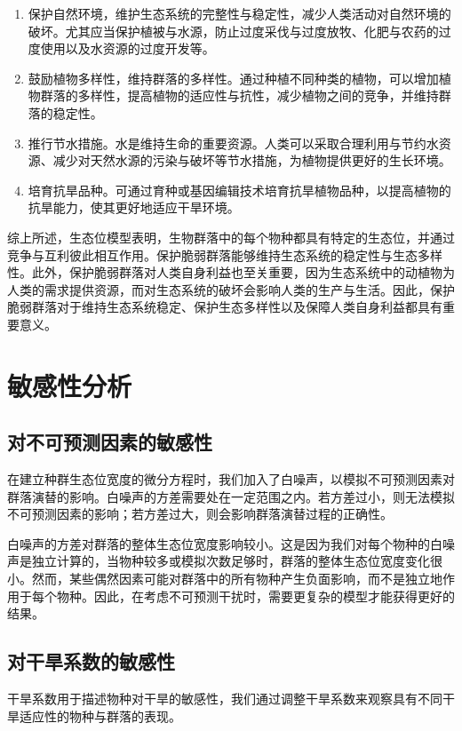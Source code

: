 \documentclass[11pt,a4paper]{ctexart}
\begin{document}
\begin{enumerate}
\item 保护自然环境，维护生态系统的完整性与稳定性，减少人类活动对自然环境的破坏。尤其应当保护植被与水源，防止过度采伐与过度放牧、化肥与农药的过度使用以及水资源的过度开发等。
\item 鼓励植物多样性，维持群落的多样性。通过种植不同种类的植物，可以增加植物群落的多样性，提高植物的适应性与抗性，减少植物之间的竞争，并维持群落的稳定性。
\item 推行节水措施。水是维持生命的重要资源。人类可以采取合理利用与节约水资源、减少对天然水源的污染与破坏等节水措施，为植物提供更好的生长环境。
\item 培育抗旱品种。可通过育种或基因编辑技术培育抗旱植物品种，以提高植物的抗旱能力，使其更好地适应干旱环境。
\end{enumerate}

综上所述，生态位模型表明，生物群落中的每个物种都具有特定的生态位，并通过竞争与互利彼此相互作用。保护脆弱群落能够维持生态系统的稳定性与生态多样性。此外，保护脆弱群落对人类自身利益也至关重要，因为生态系统中的动植物为人类的需求提供资源，而对生态系统的破坏会影响人类的生产与生活。因此，保护脆弱群落对于维持生态系统稳定、保护生态多样性以及保障人类自身利益都具有重要意义。

\section{敏感性分析}

\subsection{对不可预测因素的敏感性}

在建立种群生态位宽度的微分方程时，我们加入了白噪声，以模拟不可预测因素对群落演替的影响。白噪声的方差需要处在一定范围之内。若方差过小，则无法模拟不可预测因素的影响；若方差过大，则会影响群落演替过程的正确性。

白噪声的方差对群落的整体生态位宽度影响较小。这是因为我们对每个物种的白噪声是独立计算的，当物种较多或模拟次数足够时，群落的整体生态位宽度变化很小。然而，某些偶然因素可能对群落中的所有物种产生负面影响，而不是独立地作用于每个物种。因此，在考虑不可预测干扰时，需要更复杂的模型才能获得更好的结果。

\subsection{对干旱系数的敏感性}

干旱系数用于描述物种对干旱的敏感性，我们通过调整干旱系数来观察具有不同干旱适应性的物种与群落的表现。
\end{document}
